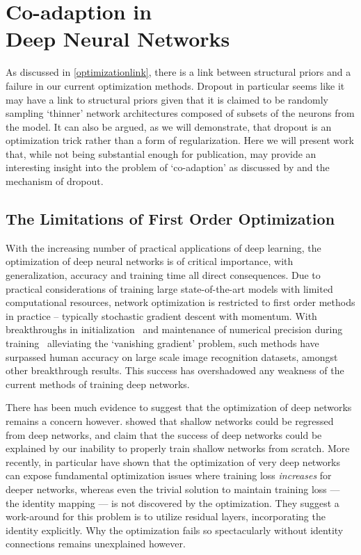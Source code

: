 \documentclass[thesis]{subfiles}
\begin{document}
\chapter[Co-adaption in Deep Neural Networks]{Co-adaption in\texorpdfstring{\\}{ }Deep Neural Networks}\label{pairablation}
As discussed in \cref{optimizationlink}, there is a link between structural priors and a failure in our current optimization methods. Dropout in particular seems like it may have a link to structural priors given that it is claimed to be randomly sampling `thinner' network architectures composed of subsets of the neurons from the model. It can also be argued, as we will demonstrate, that dropout is an optimization trick rather than a form of regularization. Here we will present work that, while not being substantial enough for publication, may provide an interesting insight into the problem of `co-adaption' as discussed by \citet{Hinton2012} and the mechanism of dropout.

\section{The Limitations of First Order Optimization}
With the increasing number of practical applications of deep learning, the optimization of deep neural networks is of critical importance, with generalization, accuracy and training time all direct consequences. Due to practical considerations of training large state-of-the-art models with limited computational resources, network optimization is restricted to first order methods in practice -- typically stochastic gradient descent with momentum. With breakthroughs in initialization~\citep{glorot2010understanding,He2015b} and maintenance of numerical precision during training~\citep{Ioffe2015} alleviating the `vanishing gradient' problem, such methods have surpassed human accuracy on large scale image recognition datasets, amongst other breakthrough results. This success has overshadowed any weakness of the current methods of training deep networks.

There has been much evidence to suggest that the optimization of deep networks remains a concern however. \citet{NIPS2014_5484} showed that shallow networks could be regressed from deep networks, and claim that the success of deep networks could be explained by our inability to properly train shallow networks from scratch. More recently, \citet{He2015,He2016} in particular have shown that the optimization of very deep networks can expose fundamental optimization issues where training loss \emph{increases} for deeper networks, whereas even the trivial solution to maintain training loss --- the identity mapping --- is not discovered by the optimization. They suggest a work-around for this problem is to utilize residual layers, incorporating the identity explicitly. Why the optimization fails so spectacularly without identity connections remains unexplained however.
\end{document}
